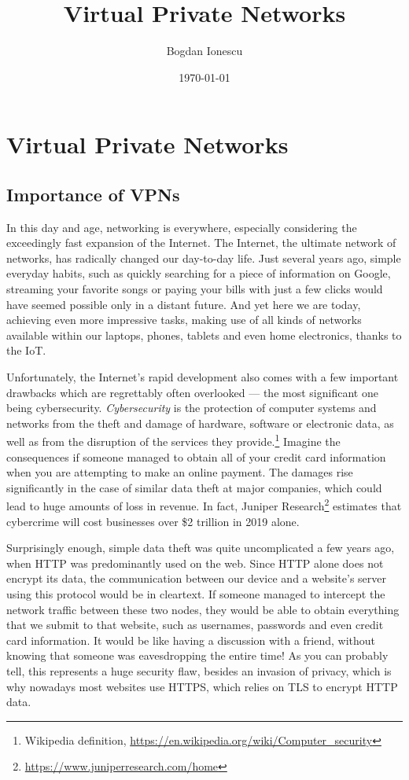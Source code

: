\documentclass[a4paper,12pt]{report}
\begin{document}
	\title{Virtual Private Networks}
	\author{Bogdan Ionescu}
	\date{\today}
	\maketitle
	\tableofcontents
	
	\chapter{Virtual Private Networks}
	\section{Importance of VPNs}
		In this day and age, networking is everywhere, especially considering the exceedingly fast expansion of the Internet. The Internet, the ultimate network of networks, has radically changed our day-to-day life. Just several years ago, simple everyday habits, such as quickly searching for a piece of information on Google, streaming your favorite songs or paying your bills with just a few clicks would have seemed possible only in a distant future. And yet here we are today, achieving even more impressive tasks, making use of all kinds of networks available within our laptops, phones, tablets and even home electronics, thanks to the IoT.
		
		Unfortunately, the Internet's rapid development also comes with a few important drawbacks which are regrettably often overlooked --- the most significant one being cybersecurity. \textit{Cybersecurity} is the protection of computer systems and networks from the theft and damage of hardware, software or electronic data, as well as from the disruption of the services they provide.\footnote{Wikipedia definition, \url{https://en.wikipedia.org/wiki/Computer_security}} Imagine the consequences if someone managed to obtain all of your credit card information when you are attempting to make an online payment. The damages rise significantly in the case of similar data theft at major companies, which could lead to huge amounts of loss in revenue. In fact, Juniper Research\footnote{\url{https://www.juniperresearch.com/home}} estimates that cybercrime will cost businesses over \$2 trillion in 2019 alone.
		
		Surprisingly enough, simple data theft was quite uncomplicated a few years ago, when HTTP was predominantly used on the web. Since HTTP alone does not encrypt its data, the communication between our device and a website's server using this protocol would be in cleartext. If someone managed to intercept the network traffic between these two nodes, they would be able to obtain everything that we submit to that website, such as usernames, passwords and even credit card information. It would be like having a discussion with a friend, without knowing that someone was eavesdropping the entire time! As you can probably tell, this represents a huge security flaw, besides an invasion of privacy, which is why nowadays most websites use HTTPS, which relies on TLS to encrypt HTTP data.
		
\end{document}
